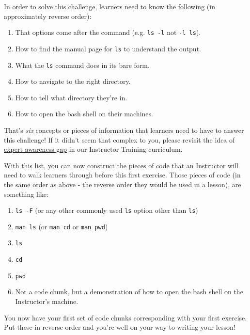 \documentclass[]{book}
\providecommand{\tightlist}{%
  \setlength{\itemsep}{0pt}\setlength{\parskip}{0pt}}
\begin{document}
In order to solve this challenge, learners need to know the following (in approximately reverse order):

\begin{enumerate}
\def\labelenumi{\arabic{enumi}.}
\tightlist
\item
  That options come after the command (e.g. \texttt{ls\ -l} not \texttt{-l\ ls}).
\item
  How to find the manual page for \texttt{ls} to understand the output.
\item
  What the \texttt{ls} command does in its bare form.
\item
  How to navigate to the right directory.
\item
  How to tell what directory they're in.
\item
  How to open the bash shell on their machines.
\end{enumerate}

That's \emph{six} concepts or pieces of information that learners need to have to answer this challenge! If it
didn't seem that complex to you, please revisit the idea of
\href{https://carpentries.github.io/instructor-training/03-expertise/index.html\#expertise-and-teaching}{expert awareness gap} in our Instructor Training
curriculum.

With this list, you can now construct the pieces of code that an Instructor will need to walk learners through
before this first exercise. Those pieces of code (in the same order as above - the reverse order they would
be used in a lesson), are something like:

\begin{enumerate}
\def\labelenumi{\arabic{enumi}.}
\tightlist
\item
  \texttt{ls\ -F} (or any other commonly used \texttt{ls} option other than \texttt{ls})
\item
  \texttt{man\ ls} (or \texttt{man\ cd} or \texttt{man\ pwd})
\item
  \texttt{ls}
\item
  \texttt{cd}
\item
  \texttt{pwd}
\item
  Not a code chunk, but a demonstration of how to open the bash shell on the Instructor's machine.
\end{enumerate}

You now have your first set of code chunks corresponding with your first exercise. Put these in reverse order
and you're well on your way to writing your lesson!
\end{document}
